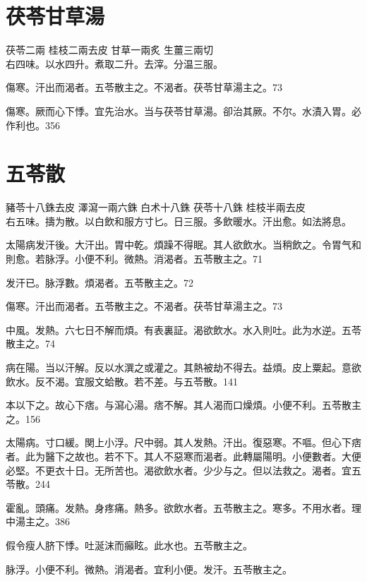 
\section{茯苓甘草湯}

茯苓{\scriptsize 二兩} 桂枝{\scriptsize 二兩去皮} 甘草{\scriptsize 一兩炙} 生薑{\scriptsize 三兩切}\\
右四味。以水四升。煮取二升。去滓。分温三服。

傷寒。汗出而渴者。五苓散主之。不渴者。茯苓甘草湯主之。73

傷寒。厥而心下悸。宜先治水。当与茯苓甘草湯。卻治其厥。不尔。水漬入胃。必作利也。356

\section{五苓散}

豬苓{\scriptsize 十八銖去皮} 澤瀉{\scriptsize 一兩六銖} 白术{\scriptsize 十八銖} 茯苓{\scriptsize 十八銖} 桂枝{\scriptsize 半兩去皮}\\
右五味。擣为散。以白飲和服方寸匕。日三服。多飲暖水。汗出愈。如法將息。

太陽病发汗後。大汗出。胃中乾。煩躁不得眠。其人欲飲水。当稍飲之。令胃气和則愈。若脉浮。小便不利。微熱。消渴者。五苓散主之。71

发汗已。脉浮數。煩渴者。五苓散主之。72

傷寒。汗出而渴者。五苓散主之。不渴者。茯苓甘草湯主之。73

中風。发熱。六七日不解而煩。有表裏証。渴欲飲水。水入則吐。此为水逆。五苓散主之。74

病在陽。当以汗解。反以水潠之或灌之。其熱被劫不得去。益煩。皮上粟起。意欲飲水。反不渴。宜服文蛤散。若不差。与五苓散。141

本以下之。故心下痞。与瀉心湯。痞不解。其人渴而口燥{\khaaitp 煩}。小便不利。五苓散主之。156

太陽病。寸{\khaaitp 口}緩。関{\khaaitp 上小}浮。尺{\khaaitp 中}弱。其人发熱。汗出。復惡寒。不嘔。但心下痞者。此为醫下之故也。若不下。其人不惡寒而渴者。此轉屬陽明。小便數者。大便必堅。不更衣十日。无所苦也。{\khaaitp 渴}欲飲水者。少少与之。但以法救之。渴者。宜五苓散。244

霍亂。頭痛。发熱。身疼痛。熱多。欲飲水者。五苓散主之。寒多。不用水者。理中湯主之。386

假令瘦人脐下悸。吐涎沫而癲眩。{\khaaitp 此}水也。五苓散主之。

脉浮。小便不利。微熱。消渴者。宜利小便。发汗。五苓散主之。

